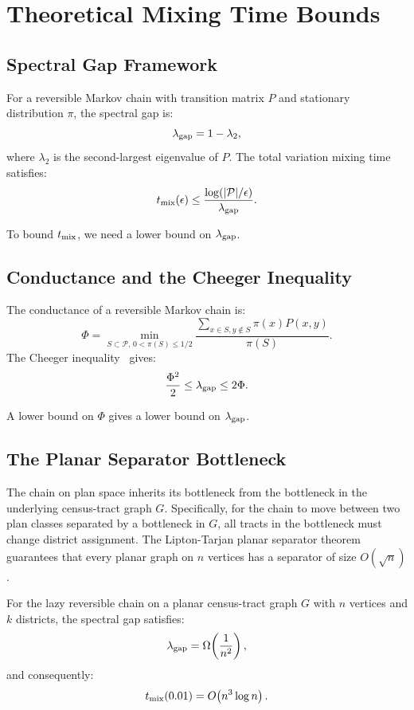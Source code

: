 \section{Theoretical Mixing Time Bounds}
\label{sec:bounds}

\subsection{Spectral Gap Framework}

For a reversible Markov chain with transition matrix $P$ and stationary
distribution $\pi$, the spectral gap is:
\[
  \lambda_{\mathrm{gap}} = 1 - \lambda_2,
\]
where $\lambda_2$ is the second-largest eigenvalue of $P$.
The total variation mixing time satisfies:
\[
  t_{\mathrm{mix}}(\epsilon) \leq \frac{\log(|\mathcal{P}| / \epsilon)}{\lambda_{\mathrm{gap}}}.
\]

To bound $t_{\mathrm{mix}}$, we need a lower bound on $\lambda_{\mathrm{gap}}$.

\subsection{Conductance and the Cheeger Inequality}

The conductance of a reversible Markov chain is:
\[
  \Phi = \min_{S \subset \mathcal{P},\, 0 < \pi(S) \leq 1/2}
  \frac{\sum_{x \in S, y \notin S} \pi(x) P(x,y)}{\pi(S)}.
\]
The Cheeger inequality~\citep{sinclair1989} gives:
\[
  \frac{\Phi^2}{2} \leq \lambda_{\mathrm{gap}} \leq 2\Phi.
\]

A lower bound on $\Phi$ gives a lower bound on $\lambda_{\mathrm{gap}}$.

\subsection{The Planar Separator Bottleneck}

The \recom{} chain on plan space inherits its bottleneck from the
bottleneck in the underlying census-tract graph $G$.
Specifically, for the chain to move between two plan classes separated
by a bottleneck in $G$, all tracts in the bottleneck must change district
assignment.
The Lipton-Tarjan planar separator theorem~\citep{lipton1979} guarantees
that every planar graph on $n$ vertices has a separator of size $O(\sqrt{n})$.

\begin{theorem}
\label{thm:mixing}
For the lazy reversible \recom{} chain on a planar census-tract graph
$G$ with $n$ vertices and $k$ districts, the spectral gap satisfies:
\[
  \lambda_{\mathrm{gap}} = \Omega\!\left(\frac{1}{n^2}\right),
\]
and consequently:
\[
  t_{\mathrm{mix}}(0.01) = O\!\left(n^3 \log n\right).
\]
\end{theorem}

